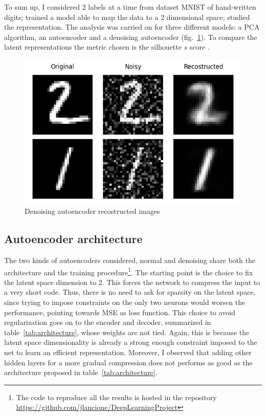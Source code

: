 \documentclass[twocolumn,gsifonts,twoside]{gsipaper}
\begin{document}
To sum up, I considered 2 labels at a time from dataset MNIST of hand-written digits; trained a model able to map the data to a 2 dimensional space; studied the representation. The analysis was carried on for three different models: a PCA algorithm, an autoencoder and a denoising autoencoder (fig.~\ref{fig:denoising_ae}). To compare the latent representations the metric chosen is the silhouette $s$ score \cite{Rousseeuw1987}. 
\begin{figure}
  \centering
  \includegraphics[width=.75\linewidth]{denoising_ae.png}
  \caption{Denoising autoencoder recostructed images}
  \label{fig:denoising_ae}
\end{figure}

\subsection{Autoencoder architecture}
The two kinds of autoencoders considered, normal and denoising share both the architecture and the training procedure\footnote{The code to reproduce all the results is hosted in the repository \url{https://github.com/jlancione/DeepLearningProject}}. The starting point is the choice to fix the latent space dimension to 2. This forces the network to compress the input to a very short code. Thus, there is no need to ask for sparsity on the latent space, since trying to impose constraints on the only two neurons would worsen the performance, pointing towards MSE as loss function. This choice to avoid regularization goes on to the encoder and decoder, summarized in table~\ref{tab:architecture}, whose weights are not tied. Again, this is because the latent space dimensionality is already a strong enough constraint imposed to the net to learn an efficient representation. Moreover, I observed that adding other hidden layers for a more gradual compression does not performs as good as the architecture proposed in table~\ref{tab:architecture}.
\end{document}
